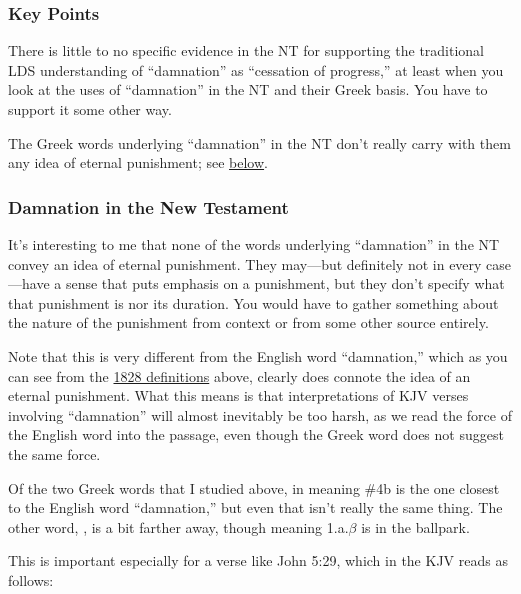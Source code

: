 	\subsubsection{Key Points}
		\label{DAMNATION-KEYS}
	
		\begin{compactitem}
			\item There is little to no specific evidence in the NT for supporting the traditional LDS understanding of ``damnation'' as ``cessation of progress,'' at least when you look at the uses of ``damnation'' in the NT and their Greek basis. You have to support it some other way.
			\item The Greek words underlying ``damnation'' in the NT don't really carry with them any idea of eternal punishment; see \hyperref[DAMNATION-new-testament]{below}.
		\end{compactitem}
		
	\subsubsection{Damnation in the New Testament}
		\label{DAMNATION-new-testament}
		
		It's interesting to me that none of the words underlying ``damnation'' in the NT convey an idea of eternal punishment. They may---but definitely not in every case---have a sense that puts emphasis on a punishment, but they don't specify what that punishment is nor its duration. You would have to gather something about the nature of the punishment from context or from some other source entirely.
		
		Note that this is very different from the English word ``damnation,'' which as you can see from the \hyperref[DAMNATION-1828]{1828 definitions} above, clearly does connote the idea of an eternal punishment. What this means is that interpretations of KJV verses involving ``damnation'' will almost inevitably be too harsh, as we read the force of the English word into the passage, even though the Greek word does not suggest the same force.
		
		Of the two Greek words that I studied above, \hyperref[KRIMA]{} in meaning \#4b is the one closest to the English word ``damnation,'' but even that isn't really the same thing. The other word, \hyperref[KRISIS]{}, is a bit farther away, though meaning 1.a.$\beta$ is in the ballpark.
		
		This is important especially for a verse like John 5:29, which in the KJV reads as follows:
		
